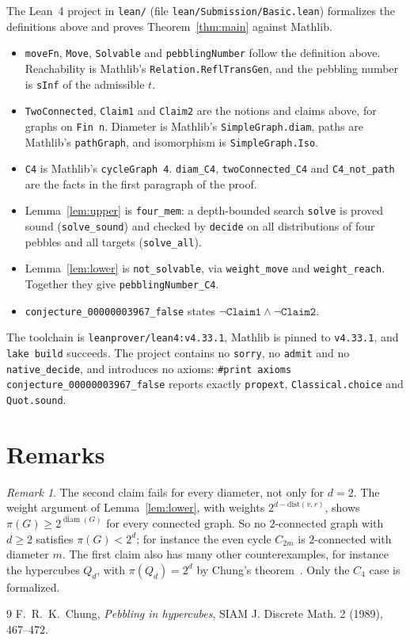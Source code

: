 \documentclass[11pt]{article}
\theoremstyle{plain}
\theoremstyle{definition}
\theoremstyle{remark}
\newtheorem{remark}[theorem]{Remark}
\newcommand{\diam}{\operatorname{diam}}
\begin{document}
\sloppy
The Lean~4 project in \texttt{lean/} (file \texttt{lean/Submission/Basic.lean})
formalizes the definitions above and proves Theorem~\ref{thm:main} against Mathlib.
\begin{itemize}
  \item \texttt{moveFn}, \texttt{Move}, \texttt{Solvable} and
    \texttt{pebblingNumber} follow the definition above. Reachability is Mathlib's
    \texttt{Relation.ReflTransGen}, and the pebbling number is \texttt{sInf} of the
    admissible $t$.
  \item \texttt{TwoConnected}, \texttt{Claim1} and \texttt{Claim2} are the notions and
    claims above, for graphs on \texttt{Fin n}. Diameter is Mathlib's
    \texttt{SimpleGraph.diam}, paths are Mathlib's \texttt{pathGraph}, and isomorphism
    is \texttt{SimpleGraph.Iso}.
  \item \texttt{C4} is Mathlib's \texttt{cycleGraph 4}. \texttt{diam\_C4},
    \texttt{twoConnected\_C4} and \texttt{C4\_not\_path} are the facts in the first
    paragraph of the proof.
  \item Lemma~\ref{lem:upper} is \texttt{four\_mem}: a depth-bounded search
    \texttt{solve} is proved sound (\texttt{solve\_sound}) and checked by
    \texttt{decide} on all distributions of four pebbles and all targets
    (\texttt{solve\_all}).
  \item Lemma~\ref{lem:lower} is \texttt{not\_solvable}, via \texttt{weight\_move} and
    \texttt{weight\_reach}. Together they give \texttt{pebblingNumber\_C4}.
  \item \texttt{conjecture\_00000003967\_false} states
    $\lnot\texttt{Claim1}\wedge\lnot\texttt{Claim2}$.
\end{itemize}
The toolchain is \texttt{leanprover/lean4:v4.33.1}, Mathlib is pinned to
\texttt{v4.33.1}, and \texttt{lake build} succeeds. The project contains no
\texttt{sorry}, no \texttt{admit} and no \texttt{native\_decide}, and introduces no
axioms: \texttt{\#print axioms conjecture\_00000003967\_false} reports exactly
\texttt{propext}, \texttt{Classical.choice} and \texttt{Quot.sound}.

\fussy
\section{Remarks}

\begin{remark}
The second claim fails for every diameter, not only for $d=2$. The weight argument of
Lemma~\ref{lem:lower}, with weights $2^{d-\mathrm{dist}(v,r)}$, shows
$\pi(G)\ge2^{\diam(G)}$ for every connected graph. So no $2$-connected graph with
$d\ge2$ satisfies $\pi(G)<2^d$; for instance the even cycle $C_{2m}$ is $2$-connected
with diameter $m$. The first claim also has many other counterexamples, for instance
the hypercubes $Q_d$, with $\pi(Q_d)=2^d$ by Chung's theorem~\cite{chung}. Only the
$C_4$ case is formalized.
\end{remark}

\begin{thebibliography}{9}
 F.~R.~K.~Chung, \emph{Pebbling in hypercubes}, SIAM J. Discrete Math.
  2 (1989), 467--472.
\end{thebibliography}
\end{document}
